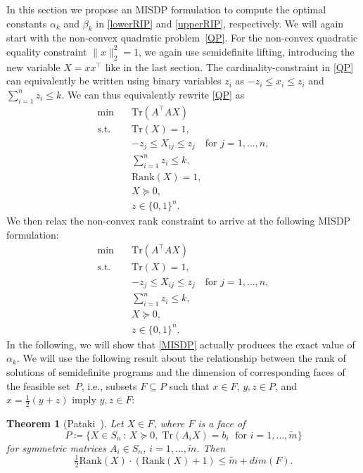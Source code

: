 \documentclass[journal]{IEEEtran}
\newtheorem{theorem}{Theorem}
\newcommand{\suchthat}{\,:\,}
\newcommand{\define}{\coloneqq}
\newcommand{\Norm}[2]{\lVert{#1}\rVert_{#2}}
\newcommand{\T}{^{\top}}
\newcommand{\Tr}{\text{Tr}}
\newcommand{\Rk}{\text{Rank}}
\begin{document}
\noindent
In this section we propose an MISDP formulation to compute the optimal
constants $\alpha_k$ and $\beta_k$ in \eqref{lowerRIP} and
\eqref{upperRIP}, respectively. We will again start with the non-convex quadratic problem~\eqref{QP}.
For the non-convex quadratic equality constraint $\Norm{x}{2}^2 = 1$, we
again use semidefinite lifting, introducing the new variable $X=xx\T$ like in the last section. 
The cardinality-constraint in \eqref{QP} can equivalently be written using
binary variables $z_i$ as $-z_i \leq x_i \leq z_i$ and $\sum_{i=1}^n z_i
\leq k$. We can thus equivalently rewrite \eqref{QP} as
\begin{equation}\label{Rk1MISDP}
 \begin{aligned}
  \min \quad & \Tr(A\T A X) \\
  \text{s.t.} \quad & \Tr(X) = 1, \\
  & -z_j \leq X_{ij} \leq z_j \quad \text{for } j = 1, \dots, n, \\
  & \sum_{i=1}^n z_i \leq k,\\
  & \Rk(X) = 1, \\
  & X \succeq 0, \\
  & z \in \{0,1\}^n.
 \end{aligned}
\end{equation}
We then relax the non-convex rank constraint to arrive at the following
MISDP formulation:
\begin{equation}\label{MISDP}\tag{MISDP}
 \begin{aligned}
  \min \quad & \Tr(A\T A X) \\
  \text{s.t.} \quad & \Tr(X) = 1, \\
  & -z_j \leq X_{ij} \leq z_j \quad \text{for } j = 1, \dots, n, \\
  & \sum_{i=1}^n z_i \leq k, \\
  & X \succeq 0, \\
  & z \in \{0,1\}^n.
 \end{aligned}
\end{equation}
In the following, we will show that \eqref{MISDP} actually produces the
exact value of $\alpha_k$. We will use the following result about the
relationship between the rank of solutions of semidefinite programs and the
dimension of corresponding faces of the feasible set~$P$, i.e., subsets $F
\subseteq P$ such that $x \in F$, $y, z \in P$, and $x = \tfrac{1}{2} (y + z)$ imply
$y,z \in F$:

\begin{theorem}[Pataki~\cite{pat98}]\label{patakiLemma}
  Let $X \in F$, where $F$ is a face of
  \begin{equation*}
    P \define \{X \in S_n \suchthat X \succeq 0,\; \Tr(A_i X) = b_i\; \text{ for } i = 1, \dots, \tilde{m}\}
  \end{equation*}
  for symmetric matrices $A_i \in S_n$, $i = 1, \dots, \tilde{m}$. Then
  \begin{equation*}
    \tfrac{1}{2}\Rk(X)\cdot(\Rk(X)+1) \leq \tilde{m} + dim(F).
  \end{equation*}
\end{theorem}
\end{document}
